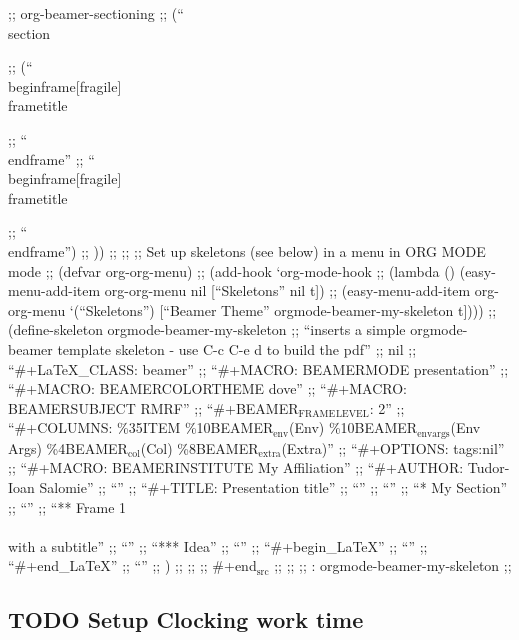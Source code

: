 \documentclass[colorlinks=true,urlcolor=blue,listings-sv]{article}
\begin{document}
  ;;        org-beamer-sectioning
  ;;        (``\\section{%
  ;;        (``\\begin{frame}[fragile]\\frametitle{%
  ;;        ``\\end{frame}''
  ;;        ``\\begin{frame}[fragile]\\frametitle{%
  ;;        ``\\end{frame}'')
  ;;      ))
  ;;  
  ;;      ;; Set up skeletons (see below) in a menu in ORG MODE mode
  ;;      (defvar org-org-menu)
  ;;      (add-hook `org-mode-hook
  ;;      (lambda () (easy-menu-add-item org-org-menu nil [``Skeletons'' nil t])
  ;;      (easy-menu-add-item org-org-menu `(``Skeletons'') [``Beamer Theme'' orgmode-beamer-my-skeleton t])))
  ;;      (define-skeleton orgmode-beamer-my-skeleton
  ;;        ``inserts a simple orgmode-beamer template skeleton - use C-c C-e d to build the pdf''
  ;;        nil
  ;;        ``\#+\LaTeX{}_CLASS: beamer\n''
  ;;        ``\#+MACRO: BEAMERMODE presentation\n''
  ;;        ``\#+MACRO: BEAMERCOLORTHEME dove\n''
  ;;        ``\#+MACRO: BEAMERSUBJECT RMRF\n''
  ;;        ``\#+BEAMER$_{\mathrm{FRAME}}$$_{\mathrm{LEVEL}}$: 2\n''
  ;;        ``\#+COLUMNS: \%35ITEM \%10BEAMER$_{\mathrm{env}}$(Env) \%10BEAMER$_{\mathrm{envargs}}$(Env Args) \%4BEAMER$_{\mathrm{col}}$(Col) \%8BEAMER$_{\mathrm{extra}}$(Extra)\n''
  ;;        ``\#+OPTIONS: tags:nil\n''
  ;;        ``\#+MACRO: BEAMERINSTITUTE My Affiliation\n''
  ;;        ``\#+AUTHOR: Tudor-Ioan Salomie\n''
  ;;        ``\n''
  ;;        ``\#+TITLE: Presentation title\n''
  ;;        ``\n''
  ;;        ``\n''
  ;;        ``* My Section\n''
  ;;        ``\n''
  ;;        ``** Frame 1 \\\\ with a subtitle\n''
  ;;        ``\n''
  ;;        ``*** Idea\n''
  ;;        ``\n''
  ;;        ``\#+begin_\LaTeX{}\n''
  ;;        ``\n''
  ;;        ``\#+end_\LaTeX{}\n''
  ;;        ``\n\n\n''
  ;;      )
  ;;  
  ;;  
  ;;  \#+end$_{\mathrm{src}}$
  ;;  
  ;;    ;;  : orgmode-beamer-my-skeleton
  ;;  
\subsection{\textbf{TODO} Setup Clocking work time}
\label{sec-2-29}



\lstset{language=Lisp}
\begin{lstlisting}


\end{lstlisting}}}}
\end{document}
